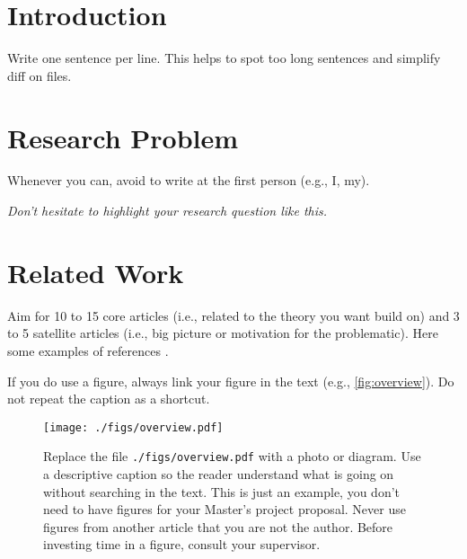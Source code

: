 \documentclass[10pt,letterpaper,oneside]{article}
\begin{document}
\makeCustomTitle
\thispagestyle{titlePage}

\section{Introduction}

Write one sentence per line.
This helps to spot too long sentences and simplify diff on files.
\lightlipsum[1-2]

\section{Research Problem}

Whenever you can, avoid to write at the first person (e.g., I, my).

\lightlipsum[1]

\begin{center}
\emph{
Don't hesitate to highlight your research question like this.
}
\end{center}

\lightlipsum[1]

\section{Related Work}
Aim for 10 to 15 core articles (i.e., related to the theory you want build on) and 3 to 5 satellite articles (i.e., big picture or motivation for the problematic).
Here some examples of references \cite{Pomerleau2013,Pomerleau2014}.

\lightlipsum[1-3]

If you do use a figure, always link your figure in the text (e.g., \autoref{fig:overview}).
Do not repeat the caption as a shortcut.

\begin{figure}[htb]
\centering
\texttt{[image: ./figs/overview.pdf]}
\caption{
Replace the file \texttt{./figs/overview.pdf} with a photo or diagram.
Use a descriptive caption so the reader understand what is going on without searching in the text.
This is just an example, you don't need to have figures for your Master's project proposal.
Never use figures from another article that you are not the author.
Before investing time in a figure, consult your supervisor.
}
\label{fig:overview}
\end{figure}
\end{document}
